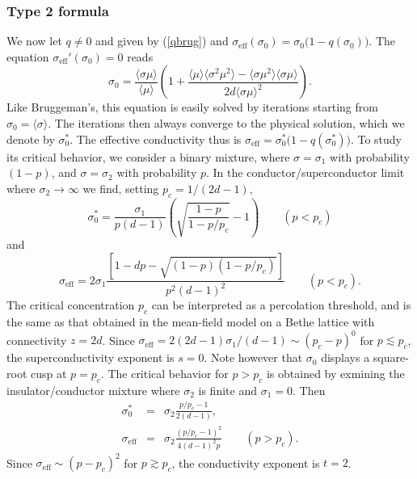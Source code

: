\subsubsection{Type 2 formula}
We now let $q\neq 0$ and given by (\ref{qbrug}) and
$\sigma_{\text{eff}}(\sigma_0)=\sigma_0\bigl(1-q(\sigma_0)\bigr)$. The
equation $\sigma_{\text{eff}}'(\sigma_0)=0$ reads
\begin{equation}
\label{eqsigo}
\sigma_0=\frac{\langle\sigma\mu\rangle}{\langle\mu\rangle}
\left(1+\frac{\langle\mu\rangle\langle\sigma^2\mu^2\rangle -\langle\sigma\mu^2\rangle\langle\sigma\mu\rangle}
{2d\langle\sigma\mu\rangle^2}\right).
\end{equation}
Like Bruggeman's, this equation is easily solved by iterations starting
from $\sigma_0=\langle\sigma\rangle$. The iterations then always
converge to the physical solution, which we denote by
$\sigma_0^*$. The effective conductivity thus is
$\sigma_{\text{eff}}=\sigma_0^*\bigl(1-q(\sigma_0^*)\bigr)$. To study
its critical behavior, we consider a binary mixture, where
$\sigma=\sigma_1$ with probability $(1-p)$, and $\sigma=\sigma_2$ with
probability $p$. In the conductor/superconductor limit where
$\sigma_2\to\infty$ we find, setting $p_c=1/(2d-1)$,
\begin{equation}
\label{sols0}
\sigma_0^*=\frac{\sigma_1}{p(d-1)}\left(\sqrt{\frac{1-p}{1-p/p_c}}
-1\right)\qquad (p<p_c)
\end{equation}
and
\begin{equation}
\label{solseff}
\sigma_{\text{eff}}=2\sigma_1\frac{\left[1-dp -\sqrt{(1-p)(1-p/p_c)}\right]}{p^2(d-1)^2}\qquad (p<p_c).
\end{equation}
The critical concentration $p_c$ can be interpreted as a percolation
threshold, and is the same as that obtained in the mean-field model on
a Bethe lattice\cite{STEP77} with connectivity $z=2d$. Since
$\sigma_{\text{eff}}=2(2d-1)\sigma_1/(d-1)\sim(p_c-p)^0$ for
$p\lesssim p_c$, the superconductivity exponent is $s=0$. Note however
that $\sigma_0$ displays a square-root cusp at $p=p_c$. The critical
behavior for $p>p_c$ is obtained by exmining the insulator/conductor
mixture where $\sigma_2$ is finite and $\sigma_1=0$. Then
\begin{eqnarray}
\sigma_0^*&=&\sigma_2\frac{p/p_c-1}{2(d-1)},\\
\sigma_{\text{eff}}&=&\sigma_2\frac{(p/p_c-1)^2}{4(d-1)^2 p}
\qquad (p>p_c).
\end{eqnarray}
Since $\sigma_{\text{eff}}\sim(p-p_c)^2$ for $p\gtrsim p_c$,
the conductivity exponent is $t=2$.

